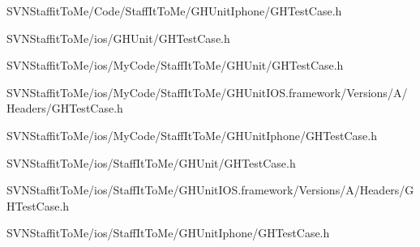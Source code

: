 \begin{DoxyCompactItemize}
\-S\-V\-N\-Staffit\-To\-Me/\-Code/\-Staff\-It\-To\-Me/\-G\-H\-Unit\-Iphone/\-G\-H\-Test\-Case.\-h\item 
\-S\-V\-N\-Staffit\-To\-Me/ios/\-G\-H\-Unit/\-G\-H\-Test\-Case.\-h\item 
\-S\-V\-N\-Staffit\-To\-Me/ios/\-My\-Code/\-Staff\-It\-To\-Me/\-G\-H\-Unit/\-G\-H\-Test\-Case.\-h\item 
\-S\-V\-N\-Staffit\-To\-Me/ios/\-My\-Code/\-Staff\-It\-To\-Me/\-G\-H\-Unit\-I\-O\-S.\-framework/\-Versions/\-A/\-Headers/\-G\-H\-Test\-Case.\-h\item 
\-S\-V\-N\-Staffit\-To\-Me/ios/\-My\-Code/\-Staff\-It\-To\-Me/\-G\-H\-Unit\-Iphone/\-G\-H\-Test\-Case.\-h\item 
\-S\-V\-N\-Staffit\-To\-Me/ios/\-Staff\-It\-To\-Me/\-G\-H\-Unit/\-G\-H\-Test\-Case.\-h\item 
\-S\-V\-N\-Staffit\-To\-Me/ios/\-Staff\-It\-To\-Me/\-G\-H\-Unit\-I\-O\-S.\-framework/\-Versions/\-A/\-Headers/\-G\-H\-Test\-Case.\-h\item 
\-S\-V\-N\-Staffit\-To\-Me/ios/\-Staff\-It\-To\-Me/\-G\-H\-Unit\-Iphone/\-G\-H\-Test\-Case.\-h\end{DoxyCompactItemize}

